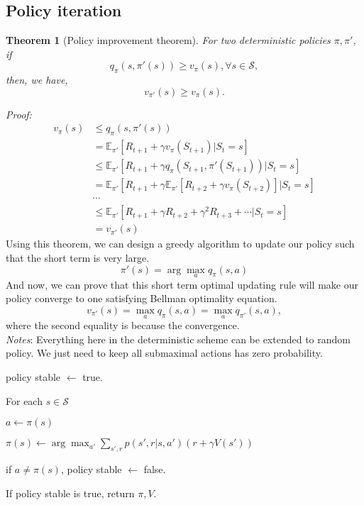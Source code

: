 \documentclass[11pt,a4paper]{article}
\def\S{{\mathcal S}}
\def\E{\mathbb{E}}
\newtheorem{theorem}{Theorem}[subsection]
\begin{document}
\subsection{Policy iteration}
\begin{theorem}[Policy improvement theorem]
For two deterministic policies $\pi,\pi'$, if 
\begin{equation}
q_{\pi}(s,\pi'(s)) \ge v_{\pi}(s), \forall s \in \S,
\end{equation}
then, we have,
\begin{equation}
v_{\pi'}(s) \ge v_{\pi}(s).
\end{equation}
\end{theorem}
\emph{Proof:}
\begin{align}
v_{\pi}(s) & \le q_{\pi}(s,\pi'(s)) \\
& = \E_{\pi'}[R_{t+1}+\gamma v_{\pi}(S_{t+1})|S_t=s] \\ 
& \le \E_{\pi'}[R_{t+1} +\gamma q_{\pi}(S_{t+1},\pi'(S_{t+1}))|S_t=s] \\
& = \E_{\pi'}[R_{t+1} + \gamma \E_{\pi'}[R_{t+2}+\gamma v_{\pi}(S_{t+2})]|S_t=s] \\ 
& \cdots \\ & \le \E_{\pi'}[R_{t+1}+\gamma R_{t+2}+\gamma^2R_{t+3}+\cdots |S_t = s] \\ 
& = v_{\pi'}(s)
\end{align}
Using this theorem, we can design a greedy algorithm to update our policy such that the short term is very large.
\begin{equation}
\pi'(s) = \arg\max_{a} q_{\pi}(s,a)
\end{equation}
And now, we can prove that this short term optimal updating rule will make our policy converge to one satisfying Bellman optimality equation.
\begin{equation}
v_{\pi'}(s) = \max_{a} q_{\pi}(s,a) = \max_a q_{\pi'}(s,a),
\end{equation}
where the second equality is because the convergence.\\ 
\emph{Notes}: Everything here in the deterministic scheme can be extended to random policy. We just need to keep all submaximal actions has zero probability.
\begin{tcolorbox}
policy stable $\leftarrow$ true. \par 
For each $s \in \S$ \par 
\hspace{1cm} $a \leftarrow \pi(s)$ \par 
\hspace{1cm} $\pi(s) \leftarrow \arg\max_{a'}\sum_{s',r}p(s',r|s,a')(r+\gamma V(s'))$ \par 
\hspace{1cm} if $a \neq \pi(s)$, policy stable $\leftarrow$ false.\par 
If policy stable is true, return $\pi,V$.
\end{tcolorbox}
\end{document}
